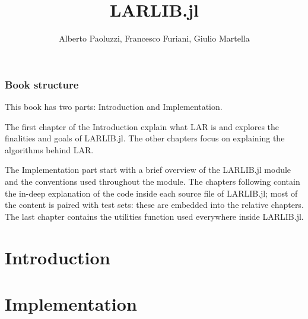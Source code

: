 \documentclass[10pt]{book}
\author{Alberto Paoluzzi, Francesco Furiani, Giulio Martella}
\title{LARLIB.jl}
\begin{document}
\frontmatter
\maketitle

\section*{Book structure}

This book has two parts: Introduction and Implementation.

The first chapter of the Introduction explain what LAR is
and explores the finalities and goals of LARLIB.jl. The other 
chapters focus on explaining the algorithms behind LAR.

The Implementation part start with a brief overview of the
LARLIB.jl module and the conventions used throughout the module.
The chapters following contain the in-deep
explanation of the code inside each source file of LARLIB.jl;
most of the content is paired with test sets: these are
embedded into the relative chapters. The last chapter
contains the utilities function used everywhere inside LARLIB.jl.

\tableofcontents

\mainmatter

\part{Introduction}


\part{Implementation}








\backmatter


{}

\end{document}
